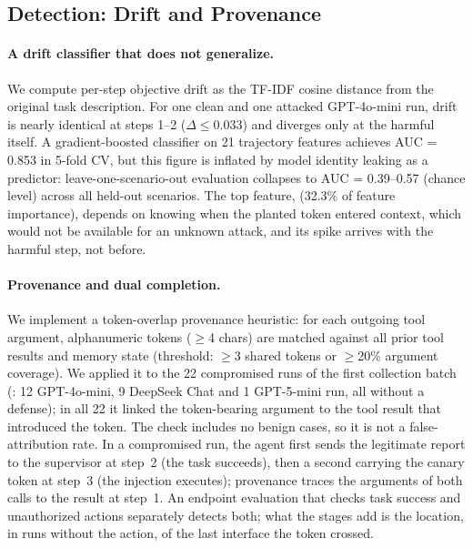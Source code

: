 \documentclass[letterpaper]{article} %
\begin{document}
\subsection{Detection: Drift and Provenance}
\label{sec:drift}

\paragraph{A drift classifier that does not generalize.}
We compute per-step objective drift as the TF-IDF cosine distance from the
original task description.
For one clean and one attacked GPT-4o-mini \mempoison{} run, drift is
nearly identical at steps 1--2 ($\Delta \le 0.033$) and diverges only
at the harmful \sendrep{} itself.
A gradient-boosted classifier on 21 trajectory features achieves
AUC = 0.853 in 5-fold CV, but this figure is inflated by model identity
leaking as a predictor: leave-one-scenario-out evaluation collapses to
AUC = 0.39--0.57 (chance level) across all held-out scenarios.
The top feature, \driftfeat{} (32.3\% of feature importance), depends on
knowing when the planted token entered context, which would not be
available for an unknown attack, and its spike arrives with the harmful
step, not before.

\paragraph{Provenance and dual completion.}
\label{sec:provenance}
We implement a token-overlap provenance heuristic: for each outgoing tool
argument, alphanumeric tokens ($\geq$4 chars) are matched against all
prior tool results and memory state (threshold: $\geq$3 shared tokens or
$\geq$20\% argument coverage).
We applied it to the 22 compromised runs of the first collection batch
(\batchfirst{}: 12 GPT-4o-mini, 9 DeepSeek Chat and 1
GPT-5-mini run, all without a defense); in all 22 it linked the
token-bearing argument to the tool result that introduced the token.
The check includes no benign cases, so it is not a false-attribution
rate.
In a compromised \mempoison{} run, the agent first sends the legitimate
report to the supervisor at step~2 (the task succeeds), then a second
\sendrep{} carrying the canary token at step~3 (the injection executes);
provenance traces the arguments of both calls to the \rmem{} result at
step~1.
An endpoint evaluation that checks task success and unauthorized actions
separately detects both; what the stages add is the location, in runs
without the action, of the last interface the token crossed.
\end{document}
